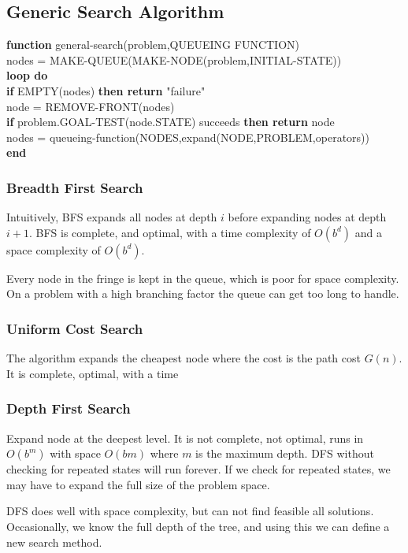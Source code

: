 \documentclass{chezarticle}
\begin{document}
\subsection{Generic Search Algorithm}
\begin{algorithm}
\textbf{function} general-search(problem,QUEUEING FUNCTION)\\
nodes = MAKE-QUEUE(MAKE-NODE(problem,INITIAL-STATE))\\
\textbf{loop do}\\
\textbf{if} EMPTY(nodes) \textbf{then return} "failure"\\
node = REMOVE-FRONT(nodes)\\
\textbf{if} problem.GOAL-TEST(node.STATE) succeeds \textbf{then return} node\\
nodes = queueing-function(NODES,expand(NODE,PROBLEM,operators))\\
\textbf{end}
\end{algorithm}

\subsubsection{Breadth First Search}
\begin{algorithm}
Intuitively, BFS expands all nodes at depth $i$ before expanding nodes at depth $i+1$. BFS is complete, and optimal, with a time complexity of $O(b^d)$ and a space complexity of $O(b^d)$.
\end{algorithm}
Every node in the fringe is kept in the queue, which is poor for space complexity. On a problem with a high branching factor the queue can get too long to handle. 
\subsubsection{Uniform Cost Search}
\begin{algorithm}
The algorithm expands the cheapest node where the cost is the path cost $G(n)$. It is complete, optimal, with a time 
\end{algorithm}
\subsubsection{Depth First Search}
\begin{algorithm}
Expand node at the deepest level. It is not complete, not optimal, runs in $O(b^m)$ with space $O(bm)$ where $m$ is the maximum depth. DFS without checking for repeated states will run forever. If we check for repeated states, we may have to expand the full size of the problem space. 
\end{algorithm}
DFS does well with space complexity, but can not find feasible all solutions.\\
Occasionally, we know the full depth of the tree, and using this we can define a new search method.
\end{document}
